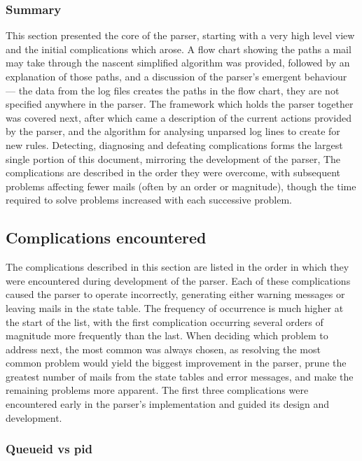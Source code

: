 \subsubsection{Summary}

This section presented the core of the parser, starting with a very high
level view and the initial complications which arose.  A flow chart showing
the paths a mail may take through the nascent simplified algorithm was
provided, followed by an explanation of those paths, and a discussion of
the parser's emergent behaviour --- the data from the log files creates the
paths in the flow chart, they are not specified anywhere in the parser.
The framework which holds the parser together was covered next, after which
came a description of the current actions provided by the parser, and the
algorithm for analysing unparsed log lines to create \regexes{} for new
rules.  Detecting, diagnosing and defeating complications forms the largest
single portion of this document, mirroring the development of the parser,
The complications are described in the order they were overcome, with
subsequent problems affecting fewer mails (often by an order or magnitude),
though the time required to solve problems increased with each successive
problem.


\subsection{Complications encountered}

\label{additional complications}
\label{complications}


The complications described in this section are listed in the order in
which they were encountered during development of the parser.  Each of
these complications caused the parser to operate incorrectly, generating
either warning messages or leaving mails in the state table.  The frequency
of occurrence is much higher at the start of the list, with the first
complication occurring several orders of magnitude more frequently than the
last.  When deciding which problem to address next, the most common was
always chosen, as resolving the most common problem would yield the biggest
improvement in the parser, prune the greatest number of mails from the
state tables and error messages, and make the remaining problems more
apparent.  The first three complications were encountered early in the
parser's implementation and guided its design and development.

\subsubsection{Queueid vs pid}

